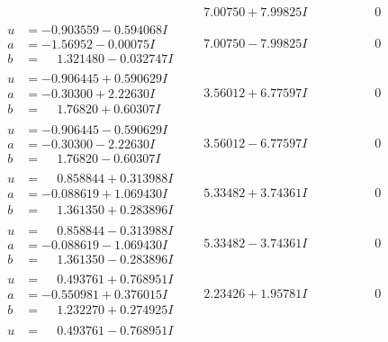 \documentclass[1p]{elsarticle_modified}
\theoremstyle{definition}
\begin{document}
$$\begin{array}{c|c|c}
 & \phantom{-}7.00750 + 7.99825 I & \phantom{-0.000000 } 0 \\ \hline\begin{aligned}
u &= -0.903559 - 0.594068 I \\
a &= -1.56952 - 0.00075 I \\
b &= \phantom{-}1.321480 - 0.032747 I\end{aligned}
 & \phantom{-}7.00750 - 7.99825 I & \phantom{-0.000000 } 0 \\ \hline\begin{aligned}
u &= -0.906445 + 0.590629 I \\
a &= -0.30300 + 2.22630 I \\
b &= \phantom{-}1.76820 + 0.60307 I\end{aligned}
 & \phantom{-}3.56012 + 6.77597 I & \phantom{-0.000000 } 0 \\ \hline\begin{aligned}
u &= -0.906445 - 0.590629 I \\
a &= -0.30300 - 2.22630 I \\
b &= \phantom{-}1.76820 - 0.60307 I\end{aligned}
 & \phantom{-}3.56012 - 6.77597 I & \phantom{-0.000000 } 0 \\ \hline\begin{aligned}
u &= \phantom{-}0.858844 + 0.313988 I \\
a &= -0.088619 + 1.069430 I \\
b &= \phantom{-}1.361350 + 0.283896 I\end{aligned}
 & \phantom{-}5.33482 + 3.74361 I & \phantom{-0.000000 } 0 \\ \hline\begin{aligned}
u &= \phantom{-}0.858844 - 0.313988 I \\
a &= -0.088619 - 1.069430 I \\
b &= \phantom{-}1.361350 - 0.283896 I\end{aligned}
 & \phantom{-}5.33482 - 3.74361 I & \phantom{-0.000000 } 0 \\ \hline\begin{aligned}
u &= \phantom{-}0.493761 + 0.768951 I \\
a &= -0.550981 + 0.376015 I \\
b &= \phantom{-}1.232270 + 0.274925 I\end{aligned}
 & \phantom{-}2.23426 + 1.95781 I & \phantom{-0.000000 } 0 \\ \hline\begin{aligned}
u &= \phantom{-}0.493761 - 0.768951 I \\

\end{aligned}
\end{array}$$
\end{document}
